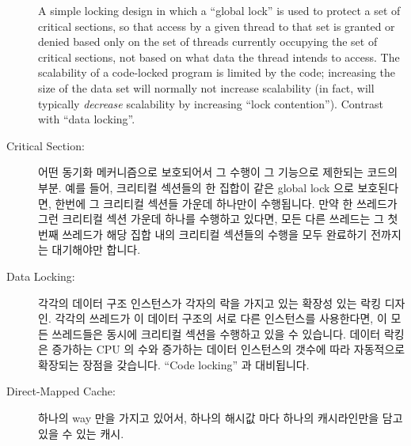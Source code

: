 \begin{description}
	A simple locking design in which a ``global lock'' is used to protect
	a set of critical sections, so that access by a given thread
	to that set is
	granted or denied based only on the set of threads currently
	occupying the set of critical sections, not based on what
	data the thread intends to access.
	The scalability of a code-locked program is limited by the code;
	increasing the size of the data set will normally not increase
	scalability (in fact, will typically \emph{decrease} scalability
	by increasing ``lock contention'').
	Contrast with ``data locking''.
	\fi
\item[Critical Section:]
	어떤 동기화 메커니즘으로 보호되어서 그 수행이 그 기능으로 제한되는
	코드의 부분.
	예를 들어, 크리티컬 섹션들의 한 집합이 같은 global lock 으로
	보호된다면, 한번에 그 크리티컬 섹션들 가운데 하나만이 수행됩니다.
	만약 한 쓰레드가 그런 크리티컬 섹션 가운데 하나를 수행하고 있다면, 모든
	다른 쓰레드는 그 첫번째 쓰레드가 해당 집합 내의 크리티컬 섹션들의
	수행을 모두 완료하기 전까지는 대기해야만 합니다.
	\iffalse

	A section of code guarded by some synchronization mechanism,
	so that its execution constrained by that primitive.
	For example, if a set of critical sections are guarded by
	the same global lock, then only one of those critical sections
	may be executing at a given time.
	If a thread is executing in one such critical section,
	any other threads must wait until the first thread completes
	before executing any of the critical sections in the set.
	\fi
\item[Data Locking:]
	각각의 데이터 구조 인스턴스가 각자의 락을 가지고 있는 확장성 있는 락킹
	디자인.
	각각의 쓰레드가 이 데이터 구조의 서로 다른 인스턴스를 사용한다면, 이
	모든 쓰레드들은 동시에 크리티컬 섹션을 수행하고 있을 수 있습니다.
	데이터 락킹은 증가하는 CPU 의 수와 증가하는 데이터 인스턴스의 갯수에
	따라 자동적으로 확장되는 장점을 갖습니다.
	``Code locking'' 과 대비됩니다.
	\iffalse

	A scalable locking design in which each instance of a given
	data structure has its own lock.
	If each thread is using a different instance of the
	data structure, then all of the threads may be executing in
	the set of critical sections simultaneously.
	Data locking has the advantage of automatically scaling to
	increasing numbers of CPUs as the number of instances of
	data grows.
	Contrast with ``code locking''.
	\fi
\item[Direct-Mapped Cache:]
	하나의 way 만을 가지고 있어서, 하나의 해시값 마다 하나의 캐시라인만을
	담고 있을 수 있는 캐시.
	\iffalse


\end{description}
